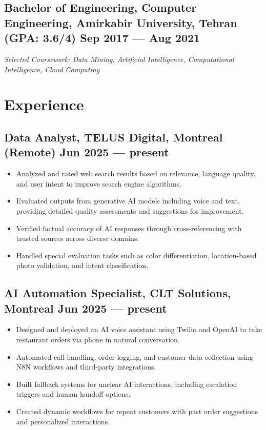 \documentclass[a4,10pt]{article}
\newcommand{\subtext}[1]{
#1\par\vspace{-0.2cm}}
\newenvironment{zitemize}{
\begin{itemize}\itemsep0pt \parskip0pt \parsep1pt}
{\end{itemize}\vspace{-0.5cm}}
\begin{document}
\subsection*{Bachelor of Engineering, Computer Engineering, {\normalsize \normalfont Amirkabir University, Tehran  (GPA: 3.6/4)} \hfill Sep 2017 --- Aug 2021} 
\textit{Selected Coursework: Data Mining, Artificial Intelligence, Computational Intelligence, Cloud Computing}



\section{Experience}

\subsection*{Data Analyst, {\normalsize\normalfont TELUS Digital, Montreal (Remote)} \hfill Jun 2025 --- present} 
    \begin{zitemize}
        \item Analyzed and rated web search results based on relevance, language quality, and user intent to improve search engine algorithms.
        \item Evaluated outputs from generative AI models including voice and text, providing detailed quality assessments and suggestions for improvement.
        \item Verified factual accuracy of AI responses through cross-referencing with trusted sources across diverse domains.
        \item Handled special evaluation tasks such as color differentiation, location-based photo validation, and intent classification.
    \end{zitemize}

    
\subsection*{AI Automation Specialist, {\normalsize\normalfont CLT Solutions, Montreal} \hfill Jun 2025 --- present} 
    \begin{zitemize}
        \item Designed and deployed an AI voice assistant using Twilio and OpenAI to take restaurant orders via phone in natural conversation.
        \item Automated call handling, order logging, and customer data collection using N8N workflows and third-party integrations.
        \item Built fallback systems for unclear AI interactions, including escalation triggers and human handoff options.
        \item Created dynamic workflows for repeat customers with past order suggestions and personalized interactions.
    \end{zitemize}
    
\end{document}
